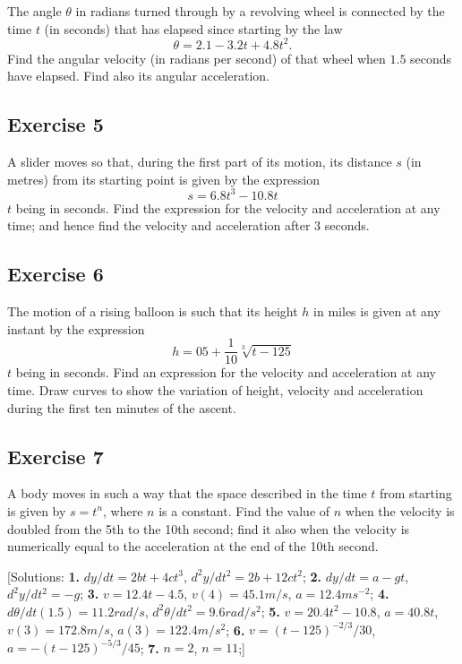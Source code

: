 \documentclass[
  english,
  11pt,
  oneside]{book}
\newcommand{\slide}{}
\theoremstyle{definition}
\theoremstyle{definition}
\theoremstyle{definition}
\theoremstyle{definition}
\theoremstyle{remark}
\begin{document}
The angle \(\theta\) in radians turned through by a revolving wheel is connected by the time \(t\) (in seconds) that has elapsed since starting by the law
\[
\theta = 2.1 - 3.2t + 4.8t^2.
\]
Find the angular velocity (in radians per second) of that wheel when \(1.5\) seconds have elapsed. Find also its angular acceleration.

\slide

\subsection*{Exercise 5}\label{exercise-5-1}

A slider moves so that, during the first part of its motion, its distance \(s\) (in metres) from its starting point is given by the expression
\[
s = 6.8t^3 - 10.8t
\]
\(t\) being in seconds. Find the expression for the velocity and acceleration at any time; and hence find the velocity and acceleration after \(3\) seconds.

\slide

\subsection*{Exercise 6}\label{exercise-6-1}

The motion of a rising balloon is such that its height \(h\) in miles is given at any instant by the expression
\[
h = 05+ \frac1{10}\sqrt[3]{t-125}
\]
\(t\) being in seconds. Find an expression for the velocity and acceleration at any time. Draw curves to show the variation of height, velocity and acceleration during the first ten minutes of the ascent.

\slide

\subsection*{Exercise 7}\label{exercise-7}

A body moves in such a way that the space described in the time \(t\) from starting is given by \(s = t^n\), where \(n\) is a constant. Find the value of \(n\) when the velocity is doubled from the 5th to the 10th second; find it also when the velocity is numerically equal to the acceleration at the end of the 10th second.

{[}Solutions:
\textbf{1.} \(dy/dt=2bt+4ct^3\), \(d^2y/dt^2=2b+12ct^2\);
\textbf{2.} \(dy/dt=a-gt\), \(d^2y/dt^2=-g\);
\textbf{3.} \(v=12.4t-4.5\), \(v(4)=45.1m/s\), \(a=12.4ms^{-2}\);
\textbf{4.} \(d\theta/dt(1.5)=11.2rad/s\), \(d^2\theta/dt^2 = 9.6rad/s^2\);
\textbf{5.} \(v=20.4t^2-10.8\), \(a=40.8t\), \(v(3)=172.8m/s\), \(a(3)=122.4m/s^2\);
\textbf{6.} \(v=(t-125)^{-2/3}/30\), \(a=-(t-125)^{-5/3}/45\);
\textbf{7.} \(n=2\), \(n=11\);{]}
\end{document}
